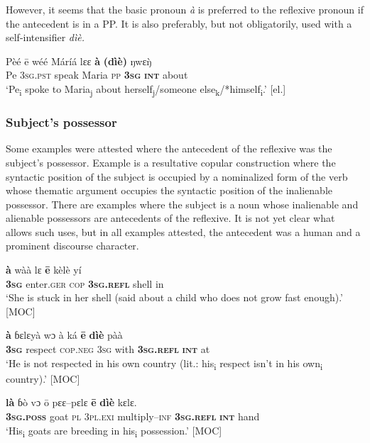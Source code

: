 \documentclass[output=paper]{langscibook}
\begin{document}
However, it seems that the basic pronoun \textit{à} is preferred to the reflexive pronoun if the antecedent is in a PP. It is also preferably, but not obligatorily, used with a self-intensifier \textit{dìè.} 

\ea
    \label{ex:Kachaturyan:34} 
 \gll Pèé  ē  wéé  Máríá  lɛɛ  \textbf{à}  \textbf{(dìè)}  ŋwɛ\`{ŋ}\\
     Pe  \textsc{3sg.pst}  speak  Maria  \textsc{pp}  \textbf{\textsc{3sg}}  \textbf{\textsc{int}}  about\\
\glt ‘Pe\textsubscript{i} spoke to Maria\textsubscript{j} about herself\textsubscript{j}/someone else\textsubscript{k}/*himself\textsubscript{i}.’ [el.]
\z


 \subsubsection{Subject’s possessor}\label{sec:Kachaturyan:5.3.3}


Some examples were attested where the antecedent of the reflexive was the subject’s possessor. Example  is a resultative copular construction where the syntactic position of the subject is occupied by a nominalized form of the verb whose thematic argument occupies the syntactic position of the inalienable possessor. There are examples where the subject is a noun whose inalienable  and alienable  possessors are antecedents of the reflexive. It is not yet clear what allows such uses, but in all examples attested, the antecedent was a human and a prominent discourse character.

\ea
    \label{ex:Kachaturyan:35} 
 \gll \textbf{à}  wàà  lɛ  \textbf{ē}  kèlè  yí\\
     \textbf{3\textsc{sg}} enter.\textsc{ger} \textsc{cop} \textbf{\textsc{3sg.refl}} shell in\\
\glt ‘She is stuck in her shell (said about a child who does not grow fast enough).’ [MOC]
\z

\ea
    \label{ex:Kachaturyan:36} 
 \gll \textbf{à}  ɓɛlɛyà  wɔ  à  ká  \textbf{ē}  \textbf{dìè}  pàà\\
     \textbf{\textsc{3sg}} respect  \textsc{cop.neg}  \textsc{3sg}  with  \textbf{\textsc{3sg.refl}}  \textbf{\textsc{int}}  at\\
\glt ‘He is not respected in his own country (lit.: his\textsubscript{i} respect isn’t in his own\textsubscript{i} country).’ [MOC]
\z

\ea
    \label{ex:Kachaturyan:37} 
 \gll \textbf{là}  ɓò  vɔ  ō  pɛɛ–pɛlɛ  \textbf{ē}  \textbf{dìè}  kɛlɛ.\\
     \textbf{3\textsc{sg}}\textbf{.\textsc{poss}  }  goat  \textsc{pl}  3\textsc{pl}.\textsc{exi}  multiply–\textsc{inf}  \textbf{3\textsc{sg}}\textbf{.\textsc{refl}}  \textbf{\textsc{int}}  hand\\
\glt ‘His\textsubscript{i} goats are breeding in his\textsubscript{i} possession.’ [MOC]
\z
\end{document}
